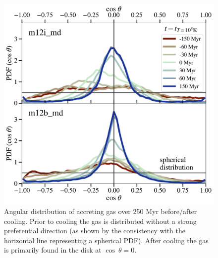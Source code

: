 \documentclass[fleqn,usenatbib]{mnras}
\begin{document}

\begin{figure}
    \centering
    \includegraphics[width=\columnwidth]{figures/theta_vs_t.pdf}
    \caption{
    Angular distribution of accreting gas over 250 Myr before/after cooling.
    Prior to cooling the gas is distributed without a strong preferential direction (as shown by the consistency with the horizontal line representing a spherical PDF).
    After cooling the gas is primarily found in the disk at $\cos\ \theta = 0$.
    }
    \label{f: theta vs R}
\end{figure}
\end{document}
